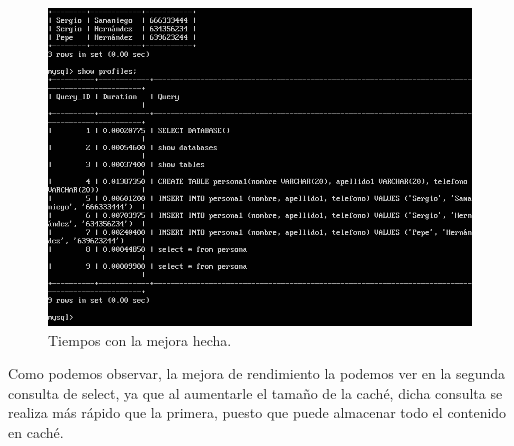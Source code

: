 \begin{figure}[H] %
	\centering
	\includegraphics[scale=0.5]{imagenes/profiles2.png}  %
	\caption{Tiempos con la mejora hecha.} \label{fig:figura22}
\end{figure}


Como podemos observar, la mejora de rendimiento la podemos ver en la segunda consulta de select, ya que al aumentarle el tamaño de la caché, dicha consulta se realiza más rápido que la primera, puesto que puede almacenar todo el contenido en caché.



\newpage



